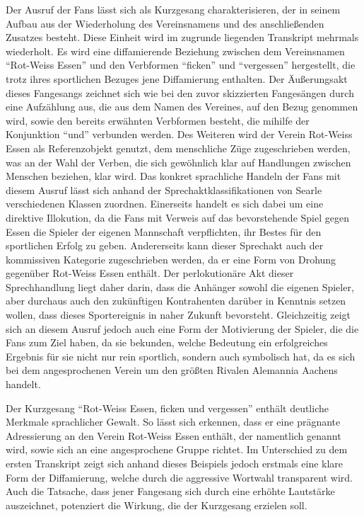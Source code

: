 Der Ausruf der Fans lässt sich als Kurzgesang charakterisieren, der in seinem Aufbau aus der Wiederholung des Vereinsnamens und des anschließenden Zusatzes besteht.
Diese Einheit wird im zugrunde liegenden Transkript mehrmals wiederholt.
Es wird eine diffamierende Beziehung zwischen dem Vereinsnamen "`Rot-Weiss Essen"' und den Verbformen "`ficken"' und "`vergessen"' hergestellt, die trotz ihres sportlichen Bezuges jene Diffamierung enthalten.
Der Äußerungsakt dieses Fangesangs zeichnet sich wie bei den zuvor skizzierten Fangesängen durch eine Aufzählung aus, die aus dem Namen des Vereines, auf den Bezug genommen wird, sowie den bereits erwähnten Verbformen besteht, die mihilfe der Konjunktion "`und"' verbunden werden.
Des Weiteren wird der Verein Rot-Weiss Essen als Referenzobjekt genutzt, dem menschliche Züge zugeschrieben werden, was an der Wahl der Verben, die sich gewöhnlich klar auf Handlungen zwischen Menschen beziehen, klar wird.
Das konkret sprachliche Handeln der Fans mit diesem Ausruf lässt sich anhand der Sprechaktklassifikationen von Searle verschiedenen Klassen zuordnen.
Einerseits handelt es sich dabei um eine direktive Illokution, da die Fans mit Verweis auf das bevorstehende Spiel gegen Essen die Spieler der eigenen Mannschaft verpflichten, ihr Bestes für den sportlichen Erfolg zu geben.
Andererseits kann dieser Sprechakt auch der kommissiven Kategorie zugeschrieben werden, da er eine Form von Drohung gegenüber Rot-Weiss Essen enthält.
Der perlokutionäre Akt dieser Sprechhandlung liegt daher darin, dass die Anhänger sowohl die eigenen Spieler, aber durchaus auch den zukünftigen Kontrahenten darüber in Kenntnis setzen wollen, dass dieses Sportereignis in naher Zukunft bevorsteht.
Gleichzeitig zeigt sich an diesem Ausruf jedoch auch eine Form der Motivierung der Spieler, die die Fans zum Ziel haben, da sie bekunden, welche Bedeutung ein erfolgreiches Ergebnis für sie nicht nur rein sportlich, sondern auch symbolisch hat, da es sich bei dem angesprochenen Verein um den größten Rivalen Alemannia Aachens handelt.

Der Kurzgesang "`Rot-Weiss Essen, ficken und vergessen"' enthält deutliche Merkmale sprachlicher Gewalt.
So lässt sich erkennen, dass er eine prägnante Adressierung an den Verein Rot-Weiss Essen enthält, der namentlich genannt wird, sowie sich an eine angesprochene Gruppe richtet.
Im Unterschied zu dem ersten Transkript zeigt sich anhand dieses Beispiels jedoch erstmals eine klare Form der Diffamierung, welche durch die aggressive Wortwahl transparent wird.
Auch die Tatsache, dass jener Fangesang sich durch eine erhöhte Lautstärke auszeichnet, potenziert die Wirkung, die der Kurzgesang erzielen soll.

